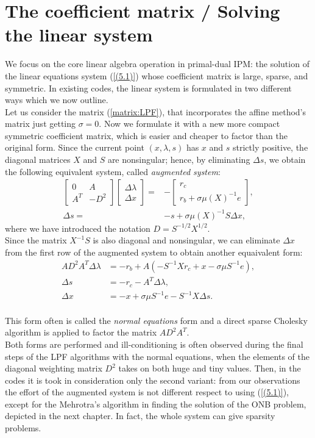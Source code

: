 \documentclass[a4paper,10 pt,titlepage,twoside]{book}
\theoremstyle{plain}
\theoremstyle{definition}
\theoremstyle{remark}
\begin{document}
\section*{The coefficient matrix / Solving the linear system}
We focus on the core linear algebra operation in primal-dual IPM: the solution of the linear equations system (\ref{(5.1)})
whose coefficient matrix is large, sparse, and symmetric. In existing codes, the linear
system is formulated in two different ways which we now outline.\\
Let us consider the matrix (\ref{matrix:LPF}), that incorporates the affine method's matrix just getting $\sigma=0$.
Now we formulate it with a new more compact symmetric coefficient matrix, which
is easier and cheaper to factor than the original form. Since the current point $(x, \lambda, s)$ has $x$ and $s$ strictly
positive, the diagonal matrices $X$ and $S$ are nonsingular; hence, by eliminating $\Delta s$, we obtain the following equivalent system, called \textit{augmented system}:
\begin{align*}
\begin{bmatrix}
0&A\\A^{T}&-D^{2}
\end{bmatrix}\begin{bmatrix}
\Delta\lambda \\\Delta x
\end{bmatrix}=&-\begin{bmatrix}
r_{c}\\r_{b} + \sigma\mu(X)^{-1}e
\end{bmatrix},\\
\Delta s =& -s +\sigma\mu (X)^{-1}S\Delta x,
\end{align*}
where we have introduced the notation $D = S^{-1/2}X^{1/2}$.\\
Since the matrix $X^{-1}S$ is also diagonal and nonsingular, we can eliminate $\Delta x$ from the first row of the augmented system to obtain another equaivalent form:
\begin{align*}
AD^{2}A^{T}\Delta\lambda &= -r_{b}+A(-S^{-1}Xr_{c}+ x - \sigma\mu S^{-1}e),\\
\Delta s &= -r_{c}-A^{T}\Delta \lambda,\\
\Delta x &= -x + \sigma \mu S^{-1}e-S^{-1}X\Delta s.
\end{align*}
\\
This form often is called the \textit{normal equations} form and a direct sparse Cholesky algorithm is applied to factor the matrix $AD^{2}A^{T}$. \\Both forms are performed and ill-conditioning is often observed during the final steps of the LPF algorithms with the normal equations, when the elements of the diagonal weighting
matrix $D^{2}$ takes on both huge and tiny values.
Then, in the codes it is took in consideration only the second variant: from our observations the effort of the augmented system is not different respect to using (\ref{(5.1)}), except for the Mehrotra's algorithm in finding the solution of the ONB problem, depicted in the next chapter. In fact, the whole system can give sparsity problems. 
\end{document}
